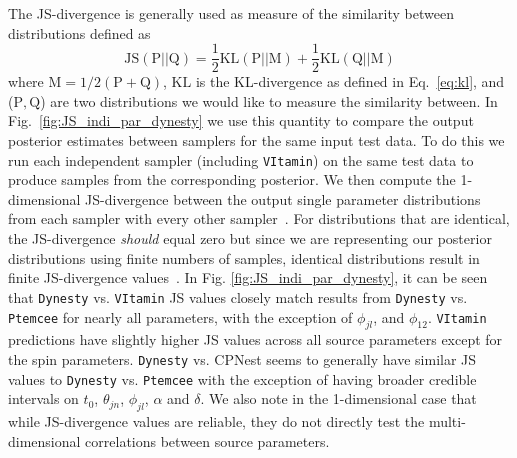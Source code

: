 %
%
The \ac{JS}-divergence is generally used as measure of the similarity 
between distributions defined as 
%
\begin{equation}\label{eq:JS_div}
    \mathrm{JS}(\mathrm{P}||\mathrm{Q}) = \frac{1}{2} \mathrm{KL}(\mathrm{P}||\mathrm{M}) + 
    \frac{1}{2} \mathrm{KL}(\mathrm{Q}||\mathrm{M}) 
\end{equation}
%
where $\mathrm{M} = 1/2(\mathrm{P} + \mathrm{Q})$, $\mathrm{KL}$ is the \ac{KL}-divergence 
as defined in Eq.~\ref{eq:kl}, and ($\mathrm{P},\mathrm{Q}$) are 
two distributions we would like to measure the similarity between. In Fig.~\ref{fig:JS_indi_par_dynesty} 
we use this quantity to compare the output posterior estimates between 
samplers for the same input test data. To do this we run each independent 
sampler (including \texttt{VItamin}) on the same test data to produce 
samples from the corresponding posterior. We then compute the 
1-dimensional \ac{JS}-divergence between the output single 
parameter distributions from each sampler with every 
other sampler~\cite{4839047}. For distributions that are 
identical, the \ac{JS}-divergence \emph{should} equal zero but since we 
are representing our posterior distributions using finite numbers of 
samples, identical distributions result in finite \ac{JS}-divergence 
values~\cite{2021MNRAS.tmp.2039A}. 
In Fig. \ref{fig:JS_indi_par_dynesty}, it can be seen that \texttt{Dynesty}  
vs. \texttt{VItamin} JS values closely match results from 
\texttt{Dynesty} vs. \texttt{Ptemcee} for nearly all parameters, with 
the exception of $\phi_{jl}$, and 
$\phi_{12}$. \texttt{VItamin} predictions have slightly 
higher \ac{JS} values across all source parameters except for the 
spin parameters. \texttt{Dynesty} vs. CPNest seems to generally 
have similar JS values to \texttt{Dynesty} vs. \texttt{Ptemcee} with 
the exception of having broader credible intervals on $t_0$, 
$\theta_{jn}$, $\phi_{jl}$, $\alpha$ and $\delta$. We also note in the  
1-dimensional case that while \ac{JS}-divergence values are reliable, they do not directly 
test the multi-dimensional correlations between source parameters. 

